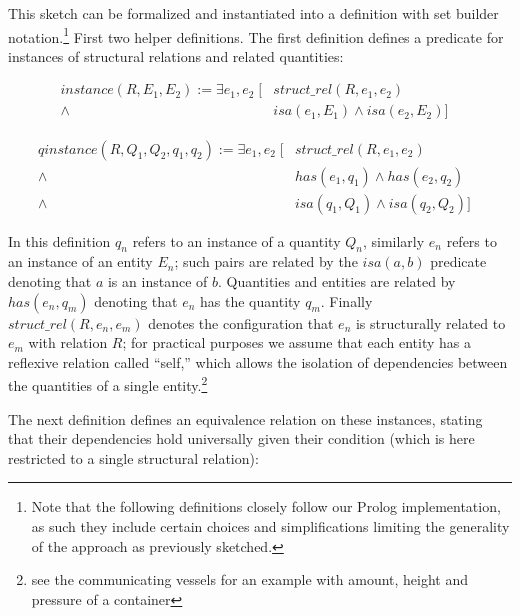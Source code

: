 \documentclass{article} %
\begin{document}
This sketch can be formalized and instantiated into a definition with set
builder notation.\footnote{Note that the following definitions closely follow
our Prolog implementation, as such they include certain choices and
simplifications limiting the generality of the approach as previously
sketched.}  First two helper definitions. The first definition defines a
predicate for instances of structural relations and related quantities:

\begin{align*}
instance(R, E_1, E_2) :=
	\exists e_1, e_2 \; [ &struct\_rel(R, e_1, e_2) & \\
	\land \; &isa(e_1, E_1) \land isa(e_2, E_2) ]
\end{align*}
	
\begin{align*}
qinstance(R, Q_1, Q_2, q_1, q_2) :=
	\exists e_1, e_2 \; [ &struct\_rel(R, e_1, e_2) & \\
	\land \; &has(e_1, q_1) \land has(e_2, q_2)  \\
	\land \; &isa(q_1, Q_1) \land isa(q_2, Q_2) ]
\end{align*}

In this definition $q_n$ refers to an instance of a quantity $Q_n$, similarly
$e_n$ refers to an instance of an entity $E_n$; such pairs are related by the
$isa(a, b)$ predicate denoting that $a$ is an instance of $b$. Quantities and
entities are related by $has(e_n, q_m)$ denoting that $e_n$ has the quantity
$q_m$. Finally $struct\_rel(R, e_n, e_m)$ denotes the configuration that $e_n$
is structurally related to $e_m$ with relation $R$; for practical purposes
we assume that each entity has a reflexive relation called ``self,'' which
allows the isolation of dependencies between the quantities of a single
entity.\footnote{see the communicating vessels for an example with amount,
height and pressure of a container} %

The next definition defines an equivalence relation on these instances,
stating that their dependencies hold universally given their condition (which
is here restricted to a single structural relation):
\end{document}
